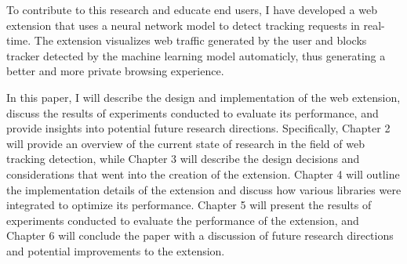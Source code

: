 To contribute to this research and educate end users, I have developed a web extension
that uses a neural network model to detect tracking requests in real-time. 
The extension visualizes web traffic generated by the user and blocks tracker detected by the machine learning model automaticly, thus
generating a better and more private browsing experience.

In this paper, I will describe the design and implementation of the web extension,
discuss the results of experiments conducted to evaluate its performance,
and provide insights into potential future research directions.
Specifically, Chapter 2 will provide an overview of the current state of research
in the field of web tracking detection, while Chapter 3 will describe the design decisions
and considerations that went into the creation of the extension. 
Chapter 4 will outline the implementation details of the extension and
discuss how various libraries were integrated to optimize its performance.
Chapter 5 will present the results of experiments conducted to evaluate
the performance of the extension, and Chapter 6 will conclude the paper
with a discussion of future research directions and potential improvements to the extension.



